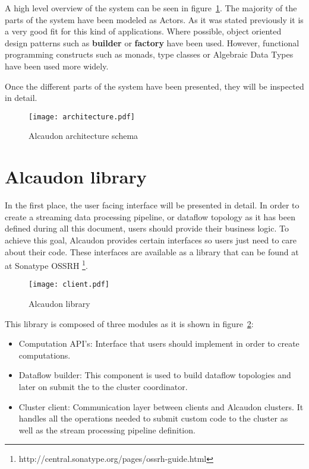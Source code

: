 A high level overview of the system can be seen in
figure~\ref{fig:architecture}. The majority of the parts of the system have been
modeled as Actors. As it was stated previously it is a very good fit for this
kind of applications. Where possible, object oriented design patterns\cite{gof}
such as \textbf{builder} or \textbf{factory} have been used. However, functional
programming constructs such as monads\cite{monads}, type
classes\cite{typeclasses} or Algebraic Data Types have been used more widely.

Once the different parts of the system have been presented, they will be
inspected in detail.

\begin{figure}
  \centering
  \texttt{[image: architecture.pdf]}
  \caption{Alcaudon architecture schema}
  \label{fig:architecture}
\end{figure}

\section{Alcaudon library}

In the first place, the user facing interface will be presented in detail. In order
to create a streaming data processing pipeline, or dataflow topology as it has
been defined during all this document, users should provide their business
logic. To achieve this goal, Alcaudon provides certain interfaces so users
just need to care about their code. These interfaces are available as a library
that can be found at at Sonatype OSSRH \footnote{http://central.sonatype.org/pages/ossrh-guide.html}.

\begin{figure}
  \centering
  \texttt{[image: client.pdf]}
  \caption{Alcaudon library}
  \label{fig:library}
\end{figure}

This library is composed of three modules as it is shown in figure~\ref{fig:library}:

\begin{itemize}
\item Computation API's: Interface that users should implement in order to
  create computations.
\item Dataflow builder: This component is used to build dataflow topologies and
  later on submit the to the cluster coordinator.
\item Cluster client: Communication layer between clients and Alcaudon clusters.
  It handles all the operations needed to submit custom code to the cluster as well
  as the stream processing pipeline definition.
\end{itemize}

